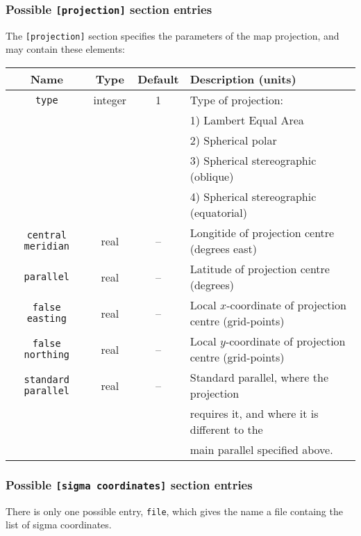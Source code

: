 \subsubsection{Possible \texttt{[projection]} section entries}
%
The \texttt{[projection]} section specifies the parameters of the map projection, and
may contain these elements:
%
\begin{center}
\begin{tabular}{|c|c|c|l|}
\hline
Name & Type & Default & Description (units) \\
\hline
\hline
\texttt{type} & integer & 1 & Type of projection: \\
 & & & 1) Lambert Equal Area \\
 & & & 2) Spherical polar \\
 & & & 3) Spherical stereographic (oblique) \\
 & & & 4) Spherical stereographic (equatorial) \\
\hline  
\texttt{central meridian} & real & -- & Longitide of projection centre (degrees east) \\
\hline
\texttt{parallel} & real & -- & Latitude of projection centre (degrees)\\
\hline
\texttt{false easting} & real & -- & Local $x$-coordinate of projection centre
(grid-points) \\
\hline
\texttt{false northing} & real & -- & Local $y$-coordinate of projection centre
(grid-points) \\
\hline
\texttt{standard parallel} & real & -- & Standard parallel, where the
projection \\
 & & & requires it, and where it is different to the \\
 & & & main parallel specified above. \\ 
\hline
\end{tabular}
\end{center}
%
\subsubsection{Possible \texttt{[sigma coordinates]} section entries}
%
There is only one possible entry, \texttt{file}, which gives the name a file
containg the list of sigma coordinates.
%
